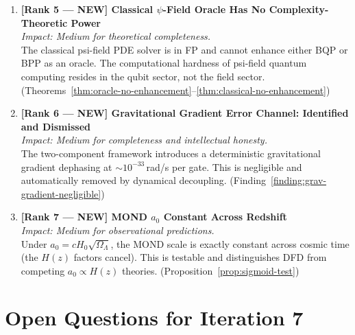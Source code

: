 \documentclass[11pt]{article}
\theoremstyle{definition}
\theoremstyle{remark}
\begin{document}
\begin{enumerate}
\item \textbf{[Rank 5 --- NEW] Classical $\psi$-Field Oracle Has No
  Complexity-Theoretic Power}\\
  \textit{Impact: Medium for theoretical completeness.}\\
  The classical psi-field PDE solver is in FP and cannot enhance either
  BQP or BPP as an oracle. The computational hardness of psi-field
  quantum computing resides in the qubit sector, not the field sector.
  (Theorems~\ref{thm:oracle-no-enhancement}--\ref{thm:classical-no-enhancement})

\item \textbf{[Rank 6 --- NEW] Gravitational Gradient Error Channel:
  Identified and Dismissed}\\
  \textit{Impact: Medium for completeness and intellectual honesty.}\\
  The two-component framework introduces a deterministic gravitational
  gradient dephasing at $\sim 10^{-33}$\,rad/s per gate. This is
  negligible and automatically removed by dynamical decoupling.
  (Finding~\ref{finding:grav-gradient-negligible})

\item \textbf{[Rank 7 --- NEW] MOND $a_0$ Constant Across Redshift}\\
  \textit{Impact: Medium for observational predictions.}\\
  Under $a_0 = cH_0\sqrt{\Omega_\Lambda}$, the MOND scale is exactly
  constant across cosmic time (the $H(z)$ factors cancel). This is
  testable and distinguishes DFD from competing $a_0 \propto H(z)$
  theories.
  (Proposition~\ref{prop:sigmoid-test})

\end{enumerate}

\section{Open Questions for Iteration 7}
\label{sec:open-questions}
\end{document}
